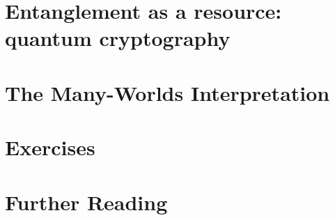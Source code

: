 \documentclass[pra,11pt]{revtex4}
\begin{document}
\section{Entanglement as a resource: quantum cryptography}

\section{The Many-Worlds Interpretation}

\section{Exercises}






\section{Further Reading}


\end{document}
